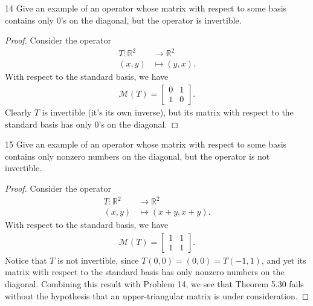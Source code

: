 \documentclass{extarticle}
\newenvironment{problem}[1]{\begin{prob*}{#1}{}}{\end{prob*}}
\newcommand{\R}{\mathbb{R}}
\newcommand{\mat}{\mathcal{M}}
\begin{document}
\begin{problem}{14}
Give an example of an operator whose matrix with respect to some basis contains only $0$'s on the diagonal, but the operator is invertible.
\end{problem}
\begin{proof}
Consider the operator 
\begin{align*}
T: \R^2 &\to \R^2 \\
    (x,y) &\mapsto (y,x).
\end{align*}
With respect to the standard basis, we have 
\begin{align*}
\mat(T) = \begin{bmatrix} 0 & 1\\ 1 & 0\end{bmatrix}.
\end{align*}
Clearly $T$ is invertible (it's its own inverse), but its matrix with respect to the standard basis has only $0$'s on the diagonal.
\end{proof}

\begin{problem}{15}
Give an example of an operator whose matrix with respect to some basis contains only nonzero numbers on the diagonal, but the operator is not invertible.
\end{problem}
\begin{proof}
Consider the operator
\begin{align*}
T: \R^2 &\to \R^2\\
(x,y) &\mapsto (x + y, x + y).
\end{align*}
With respect to the standard basis, we have
\begin{align*}
\mat(T) = \begin{bmatrix} 1 & 1\\ 1 & 1\end{bmatrix}.
\end{align*}
Notice that $T$ is not invertible, since $T(0, 0) = (0, 0) = T(-1, 1)$, and yet its matrix with respect to the standard basis has only nonzero numbers on the diagonal.  Combining this result with Problem 14, we see that Theorem 5.30 fails without the hypothesis that an upper-triangular matrix is under consideration.
\end{proof}
\end{document}

